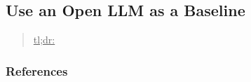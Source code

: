



\subsection{Use an Open LLM as a Baseline}
\label{sec:use-an-open-llm-as-a-baseline}

\begin{quote}
\underline{tl;dr:} 
\end{quote}



\subsubsection{References}





